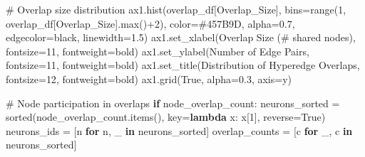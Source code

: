 \documentclass[
  11pt,
  letterpaper,
  oneside,
  openany]{book}
\newenvironment{Shaded}{\begin{snugshade}}{\end{snugshade}}
\newcommand{\BuiltInTok}[1]{\textcolor[rgb]{0.00,0.23,0.31}{#1}}
\newcommand{\CommentTok}[1]{\textcolor[rgb]{0.37,0.37,0.37}{#1}}
\newcommand{\ControlFlowTok}[1]{\textcolor[rgb]{0.00,0.23,0.31}{\textbf{#1}}}
\newcommand{\DecValTok}[1]{\textcolor[rgb]{0.68,0.00,0.00}{#1}}
\newcommand{\FloatTok}[1]{\textcolor[rgb]{0.68,0.00,0.00}{#1}}
\newcommand{\KeywordTok}[1]{\textcolor[rgb]{0.00,0.23,0.31}{\textbf{#1}}}
\newcommand{\NormalTok}[1]{\textcolor[rgb]{0.00,0.23,0.31}{#1}}
\newcommand{\OperatorTok}[1]{\textcolor[rgb]{0.37,0.37,0.37}{#1}}
\newcommand{\StringTok}[1]{\textcolor[rgb]{0.13,0.47,0.30}{#1}}
\newcommand{\VariableTok}[1]{\textcolor[rgb]{0.07,0.07,0.07}{#1}}
\begin{document}
\begin{Shaded}
\begin{Highlighting}[]
    \CommentTok{\# Overlap size distribution}
\NormalTok{    ax1.hist(overlap\_df[}\StringTok{\textquotesingle{}Overlap\_Size\textquotesingle{}}\NormalTok{], bins}\OperatorTok{=}\BuiltInTok{range}\NormalTok{(}\DecValTok{1}\NormalTok{, overlap\_df[}\StringTok{\textquotesingle{}Overlap\_Size\textquotesingle{}}\NormalTok{].}\BuiltInTok{max}\NormalTok{()}\OperatorTok{+}\DecValTok{2}\NormalTok{),}
\NormalTok{             color}\OperatorTok{=}\StringTok{\textquotesingle{}\#457B9D\textquotesingle{}}\NormalTok{, alpha}\OperatorTok{=}\FloatTok{0.7}\NormalTok{, edgecolor}\OperatorTok{=}\StringTok{\textquotesingle{}black\textquotesingle{}}\NormalTok{, linewidth}\OperatorTok{=}\FloatTok{1.5}\NormalTok{)}
\NormalTok{    ax1.set\_xlabel(}\StringTok{\textquotesingle{}Overlap Size (\# shared nodes)\textquotesingle{}}\NormalTok{, fontsize}\OperatorTok{=}\DecValTok{11}\NormalTok{, fontweight}\OperatorTok{=}\StringTok{\textquotesingle{}bold\textquotesingle{}}\NormalTok{)}
\NormalTok{    ax1.set\_ylabel(}\StringTok{\textquotesingle{}Number of Edge Pairs\textquotesingle{}}\NormalTok{, fontsize}\OperatorTok{=}\DecValTok{11}\NormalTok{, fontweight}\OperatorTok{=}\StringTok{\textquotesingle{}bold\textquotesingle{}}\NormalTok{)}
\NormalTok{    ax1.set\_title(}\StringTok{\textquotesingle{}Distribution of Hyperedge Overlaps\textquotesingle{}}\NormalTok{, fontsize}\OperatorTok{=}\DecValTok{12}\NormalTok{, fontweight}\OperatorTok{=}\StringTok{\textquotesingle{}bold\textquotesingle{}}\NormalTok{)}
\NormalTok{    ax1.grid(}\VariableTok{True}\NormalTok{, alpha}\OperatorTok{=}\FloatTok{0.3}\NormalTok{, axis}\OperatorTok{=}\StringTok{\textquotesingle{}y\textquotesingle{}}\NormalTok{)}
    
    \CommentTok{\# Node participation in overlaps}
    \ControlFlowTok{if}\NormalTok{ node\_overlap\_count:}
\NormalTok{        neurons\_sorted }\OperatorTok{=} \BuiltInTok{sorted}\NormalTok{(node\_overlap\_count.items(), key}\OperatorTok{=}\KeywordTok{lambda}\NormalTok{ x: x[}\DecValTok{1}\NormalTok{], reverse}\OperatorTok{=}\VariableTok{True}\NormalTok{)}
\NormalTok{        neurons\_ids }\OperatorTok{=}\NormalTok{ [n }\ControlFlowTok{for}\NormalTok{ n, \_ }\KeywordTok{in}\NormalTok{ neurons\_sorted]}
\NormalTok{        overlap\_counts }\OperatorTok{=}\NormalTok{ [c }\ControlFlowTok{for}\NormalTok{ \_, c }\KeywordTok{in}\NormalTok{ neurons\_sorted]}
        

\end{Highlighting}
\end{Shaded}
\end{document}
